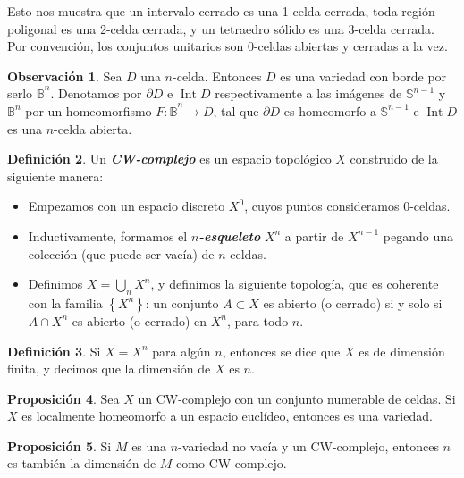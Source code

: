 \documentclass[10pt]{report}
\DeclareMathOperator{\interior}{Int} %
\newcommand{\enfatiza}[1]{\textbf{\textit{#1}}}
\theoremstyle{definition}
\newtheorem{defin}{Definición}[section]
\newtheorem{prop}[defin]{Proposición}
\newtheorem{obs}[defin]{Observación}
\begin{document}
Esto nos muestra que un intervalo cerrado es una 1-celda cerrada, toda región poligonal es una 2-celda cerrada, y un tetraedro sólido es una 3-celda cerrada. Por convención, los conjuntos unitarios son 0-celdas abiertas y cerradas a la vez.

\begin{obs}
Sea $D$ una $n$-celda. Entonces $D$ es una variedad con borde por serlo $\overline{\mathbb{B}}^n$. Denotamos por $\partial D$ e $\interior{D}$ respectivamente a las imágenes de $\mathbb{S}^{n-1}$ y $\mathbb{B}^n$ por un homeomorfismo $F:\overline{\mathbb{B}}^n\to D$, tal que $\partial D$ es homeomorfo a $\mathbb{S}^{n-1}$ e $\interior{D}$ es una $n$-celda abierta.
\end{obs}

\begin{defin}\label{def:cw}%
Un \enfatiza{CW-complejo} es un espacio topológico $X$ construido de la siguiente manera:
\begin{itemize}
\item[(1)] Empezamos con un espacio discreto $X^0$, cuyos puntos consideramos 0-celdas.
\item[(2)] Inductivamente, formamos el \enfatiza{$n$-esqueleto} $X^n$ a partir de $X^{n-1}$ pegando una colección (que puede ser vacía) de $n$-celdas.
\item[(3)] Definimos $X=\bigcup_n X^n$, y definimos la siguiente topología, que es coherente con la familia $\left\{X^n\right\}$: un conjunto $A\subset X$ es abierto (o cerrado) si y solo si $A\cap X^n$ es abierto (o cerrado) en $X^n$, para todo $n$. 
\end{itemize}
\end{defin}

\begin{defin}
Si $X=X^n$ para algún $n$, entonces se dice que $X$ es de dimensión finita, y decimos que la dimensión de $X$ es $n$.
\end{defin}

\begin{prop}\label{prop:cw_variedad}%
Sea $X$ un CW-complejo con un conjunto numerable de celdas. Si $X$ es localmente homeomorfo a un espacio euclídeo, entonces es una variedad.
\end{prop}

\begin{prop}
Si $M$ es una $n$-variedad no vacía y un CW-complejo, entonces $n$ es también la dimensión de $M$ como CW-complejo.
\end{prop}
\end{document}
